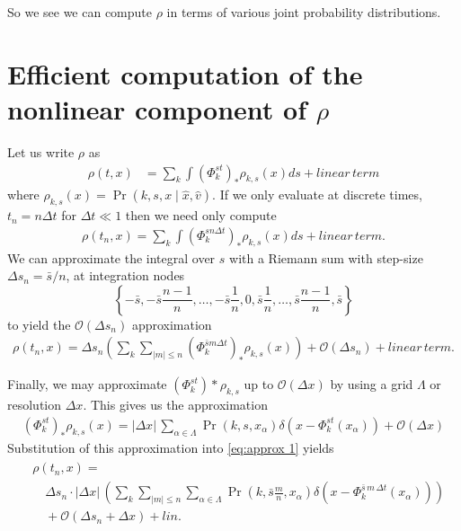 \documentclass[12pt]{amsart}
\begin{document}
So we see we can compute $\rho$ in terms of various joint probability distributions.

\section{Efficient computation of the nonlinear component of $\rho$}
Let us write $\rho$ as
\begin{align*}
	\rho(t,x) &= \sum_{k} \int (\Phi_{k}^{st})_* \rho_{k,s}(x) ds + linear\, term
\end{align*}
where $\rho_{k,s}(x) = \Pr( k, s, x \mid \hat{x}, \hat{v})$.
If we only evaluate at discrete times, $t_n = n \Delta t$ for $\Delta t \ll 1$ then we need only compute
\begin{align*}
	\rho(t_n , x) =  \sum_{k} \int (\Phi_{k}^{s n \Delta t})_* \rho_{k,s}(x) ds + linear\, term.
\end{align*}
We can approximate the integral over $s$ with a Riemann sum with step-size $\Delta s_n = \bar{s} / n$, at integration nodes
$$
	\left\{ -\bar{s} , -\bar{s} \frac{n-1}{n}, \dots, -\bar{s} \frac{1}{n}, 0, \bar{s} \frac{1}{n}, \dots, \bar{s} \frac{n-1}{n}, \bar{s} \right\}
$$
to yield the $\mathcal{O}( \Delta s_n )$ approximation
\begin{align}
	\rho(t_n , x) = \Delta s_n \left( \sum_{k} \sum_{ |m| \leq n } (\Phi_{k}^{ \bar{s} m \Delta t})_* \rho_{k,s}(x) \right) +\mathcal{O}( \Delta s_n ) + linear\, term. \label{eq:approx 1}
\end{align}

Finally, we may approximate $(\Phi_k^{st})*\rho_{k,s}$ up to $\mathcal{O}( \Delta x)$ by using a grid $\Lambda$ or resolution $\Delta x$.
This gives us the approximation
\begin{align*}
	(\Phi_k^{st})_* \rho_{k,s}(x) = |\Delta x |\, \sum_{\alpha \in \Lambda } \Pr( k , s , x_\alpha) \delta( x - \Phi_k^{st} (x_\alpha) ) + \mathcal{O}( \Delta x )
\end{align*}
Substitution of this approximation into \eqref{eq:approx 1} yields 
\begin{align}
\begin{split}
	&\rho(t_n , x) = \\
	&\quad \Delta s_n \cdot | \Delta x| \, \left( \sum_{k} \sum_{ |m| \leq n }  \sum_{\alpha \in \Lambda } \Pr( k , \bar{s}\frac{m}{n} , x_\alpha) \delta( x - \Phi_k^{\bar{s}\, m \, \Delta t} (x_\alpha) ) \right) \\
	&\quad +\mathcal{O}( \Delta s_n + \Delta x) + lin. \label{eq:approx 2}
\end{split}
\end{align}
\end{document}
